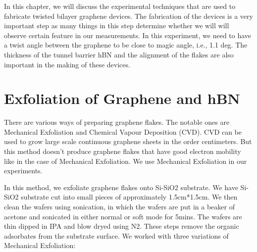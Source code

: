 In this chapter, we will discuss the experimental techniques that are used to fabricate twisted bilayer graphene devices. The fabrication of the devices is a very important step as many things in this step determine whether we will will observe certain feature in our measurements. In this experiment, we need to have a twist angle between the graphene to be close to magic angle, i.e., 1.1 deg. The thickness of the tunnel barrier hBN and the alignment of the flakes are also important in the making of these devices.

\section{Exfoliation of Graphene and hBN}

There are various ways of preparing graphene flakes. \cite{Bhuyan2016} The notable ones are Mechanical Exfoliation and Chemical Vapour Deposition (CVD). CVD can be used to grow large scale continuous graphene sheets in the order centimeters. But this method doesn't produce graphene flakes that have good electron mobility like in the case of Mechanical Exfoliation. We use Mechanical Exfoliation in our experiments.

In this method, we exfoliate graphene flakes onto Si-SiO2 substrate. We have Si-SiO2 substrate cut into small pieces of approximately 1.5cm*1.5cm. We then clean the wafers using sonication, in which the wafers are put in a beaker of acetone and sonicated in either normal or soft mode for 5mins. The wafers are thin dipped in IPA and blow dryed using N2. These steps remove the organic adsorbates from the substrate surface. We worked with three variations of Mechanical Exfoliation:

